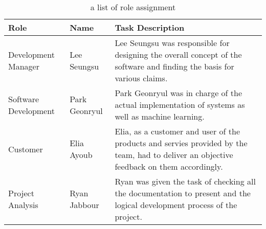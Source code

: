 \documentclass[conference]{IEEEtran}
\begin{document}
\begin{abstract}
\end{abstract}


\begin{table}[h]
    \caption{a list of role assignment}
    \begin{tabular}{|p{2.6cm}|p{1.7cm}|p{3.4cm}|}
    \hline
    Role & Name & Task Description \\ \hline
      Development Manager & Lee Seungsu & Lee Seungsu was responsible for designing the overall concept of the software and finding the basis for various claims.\\ \hline
      Software Development & Park Geonryul & Park Geonryul was in charge of the actual implementation of systems as well as machine learning.\\ \hline
      Customer & Elia Ayoub & Elia, as a customer and user of the products and servies provided by the team, had to deliver an objective feedback on them accordingly.\\ \hline
      Project Analysis & Ryan Jabbour & Ryan was given the task of checking all the documentation to present and the logical development process of the project.\\ \hline
    \end{tabular}
    \end{table}










\end{document}
